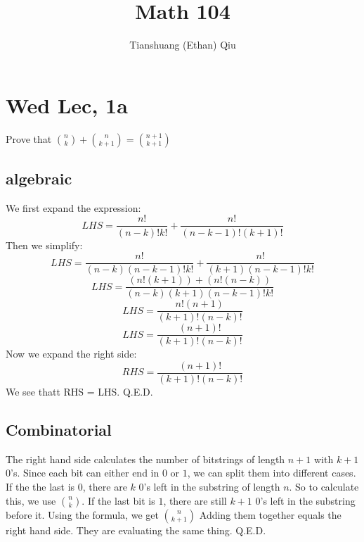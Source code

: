 \documentclass[12pt]{article}
\author{Tianshuang (Ethan) Qiu}
\begin{document}
\title{Math 104}
\maketitle

\section{Wed Lec, 1a}
Prove that $\binom{n}{k} + \binom{n}{k+1} = \binom{n+1}{k+1}$
\subsection{algebraic}
We first expand the expression:
$$LHS = \frac{n!}{(n-k)!k!} + \frac{n!}{(n-k-1)!(k+1)!}$$
Then we simplify:
$$LHS = \frac{n!}{(n-k)(n-k-1)!k!} + \frac{n!}{(k+1)(n-k-1)!k!}$$
$$LHS = \frac{(n!(k+1))+(n!(n-k))}{(n-k)(k+1)(n-k-1)!k!} $$
$$LHS = \frac{n!(n+1)}{(k+1)!(n-k)!} $$
$$LHS = \frac{(n+1)!}{(k+1)!(n-k)!}$$
Now we expand the right side:
$$RHS = \frac{(n+1)!}{(k+1)!(n-k)!}$$
We see thatt RHS = LHS.
\newline
Q.E.D.

\subsection{Combinatorial}
The right hand side calculates the number of bitstrings of length $n+1$ with $k+1$ 0's. Since each bit can either end in $0$ or $1$, we can split them into different cases.
\newline
If the the last is $0$, there are $k$ 0's left in the substring of length $n$. So to calculate this, we use $\binom{n}{k}$.
\newline
If the last bit is $1$, there are still $k+1$ 0's left in the substring before it. Using the formula, we get $\binom {n}{k+1}$
\newline
Adding them together equals the right hand side. They are evaluating the same thing.
\newline
Q.E.D.
\end{document}
